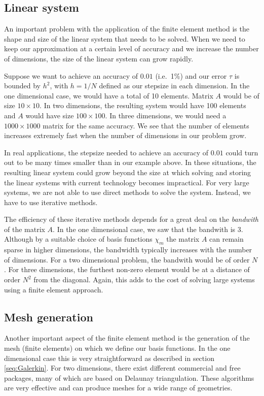 \documentclass[a4paper]{article}
\begin{document}
\subsection{Linear system}

An important problem with the application of the finite element method
is the shape and size of the linear system that needs to be solved.
When we need to keep our approximation at a certain level of accuracy
and we increase the number of dimensions, the size of the linear
system can grow rapidly.

Suppose we want to achieve an accuracy of $0.01$ (i.e.\ 1\%) and our
error $\tau$ is bounded by $h^2$, with $h = 1/N$ defined as our stepsize in
each dimension. In the one dimensional case, we would have a total of
10 elements. Matrix $A$ would be of size $10 \times 10$. In two
dimensions, the resulting system would have 100 elements and $A$ would
have size $100 \times 100$. In three dimensions, we would need a $1000
\times 1000$ matrix for the same accuracy. We see that the number of
elements increases extremely fast when the number of dimensions in our
problem grow.

In real applications, the stepsize needed to achieve an accuracy of
$0.01$ could turn out to be many times smaller than in our example
above. In these situations, the resulting linear system could grow
beyond the size at which solving and storing the linear systems with
current technology becomes impractical. For very large systems, we are
not able to use direct methods to solve the system. Instead, we have
to use iterative methods.

The efficiency of these iterative methods depends for a great deal on
the \emph{bandwith} of the matrix $A$. In the one dimensional case, we
saw that the bandwith is 3. Although by a suitable choice of basis
functions $\chi_m$ the matrix $A$ can remain sparse in higher
dimensions, the bandwidth typically increases with the number of
dimensions. For a two dimensional problem, the bandwith would be of
order $N$. For three dimensions, the furthest non-zero element would
be at a distance of order $N^2$ from the diagonal. Again, this adds to
the cost of solving large systems using a finite element approach.

\subsection{Mesh generation}

Another important aspect of the finite element method is the
generation of the mesh (finite elements) on which we define our basis
functions. In the one dimensional case this is very straightforward
as described in section \ref{seq:Galerkin}. For two dimensions, there
exist different commercial and free packages, many of which are based
on Delaunay triangulation. These algorithms are very effective and
can produce meshes for a wide range of geometries.
\end{document}
